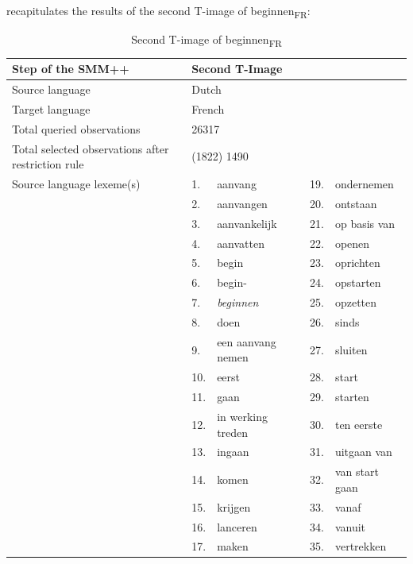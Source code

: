  recapitulates the results of the second T-image of beginnen\textsubscript{FR}:

\begin{table}
\caption{Second T-image of beginnen\textsubscript{FR}\label{tab:3:11}}
\small
\begin{tabularx}{\textwidth}{p{}lXlX}
\lsptoprule
Step of the SMM++ & \multicolumn{4}{l}{Second T-Image}\\ \midrule
\rowcolor{lsLightGray} Source language & \multicolumn{4}{l}{ Dutch}\\
Target language & \multicolumn{4}{l}{ French}\\
\rowcolor{lsLightGray} Total queried observations & \multicolumn{4}{l}{26317}\\
Total selected observations after restriction rule & \multicolumn{4}{l}{ (1822) 1490\footnotemark{}}\\
\rowcolor{lsLightGray} Source language lexeme(s) & 1.& aanvang & 19.& ondernemen\\
\rowcolor{lsLightGray}& 2.& aanvangen & 20.& ontstaan\\
\rowcolor{lsLightGray}& 3.& aanvankelijk & 21.& op basis van\\
\rowcolor{lsLightGray}& 4.& aanvatten & 22.& openen\\
\rowcolor{lsLightGray}& 5.& begin & 23.& oprichten\\
\rowcolor{lsLightGray}& 6.& begin- & 24.& opstarten\\
\rowcolor{lsLightGray}& 7.& \textit{beginnen} & 25.& opzetten\\
\rowcolor{lsLightGray}& 8.& doen & 26.& sinds\\
\rowcolor{lsLightGray}& 9.& een aanvang nemen & 27.& sluiten\\
\rowcolor{lsLightGray}& 10.& eerst & 28.& start\\
\rowcolor{lsLightGray}& 11.& gaan & 29.& starten\\
\rowcolor{lsLightGray}& 12.& in werking treden & 30.& ten eerste\\
\rowcolor{lsLightGray}& 13.& ingaan & 31.& uitgaan van\\
\rowcolor{lsLightGray}& 14.& komen & 32.& van start gaan\\
\rowcolor{lsLightGray}& 15.& krijgen & 33.& vanaf\\
\rowcolor{lsLightGray}& 16.& lanceren & 34.& vanuit\\
\rowcolor{lsLightGray}& 17.& maken & 35.& vertrekken\\

\end{tabularx}
\end{table}
